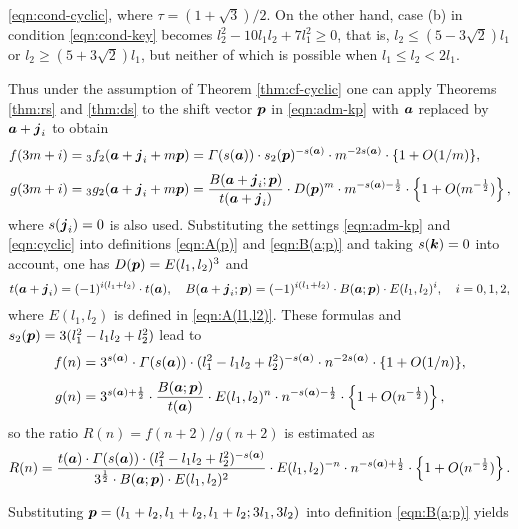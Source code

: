 \documentclass[a4paper,12pt]{article}
\theoremstyle{plain}
\def\vG{\varGamma}
\def\ba{\mbox{\boldmath $a$}}
\def\sba{\mbox{\boldmath ${\scriptstyle a}$}}
\def\bj{\mbox{\boldmath $j$}}
\def\bk{\mbox{\boldmath $k$}}
\def\bp{\mbox{\boldmath $p$}}
\begin{document}
\eqref{eqn:cond-cyclic}, where $\tau = (1+\sqrt{3})/2$.    
On the other hand, case (b) in condition \eqref{eqn:cond-key} becomes   
$l_2^2 - 10 l_1 l_2 + 7 l_1^2 \ge 0$, that is, $l_2 \le (5-3 \sqrt{2}) l_1$ or 
$l_2 \ge (5 + 3\sqrt{2}) l_1$, but neither of which is possible when 
$l_1 \le l_2 < 2 l_1$.  
\par
Thus under the assumption of Theorem \ref{thm:cf-cyclic} one can apply  
Theorems \ref{thm:rs} and \ref{thm:ds} to the shift vector $\bp$ in 
\eqref{eqn:adm-kp} with $\ba$ replaced by $\ba+\bj_i$ to obtain    
\begin{align*}
f(3 m + i) &= {}_3f_2(\ba + \bj_i + m \bp) = \vG(s(\ba)) \cdot s_2(\bp)^{-s(\sba)} 
\cdot m^{-2 s(\sba)} \cdot \{ 1 + O(1/m)\},  \\[1mm]  
g(3 m + i) &=  {}_3g_2(\ba + \bj_i + m \bp) = 
\dfrac{B(\ba + \bj_i ; \bp)}{t(\ba + \bj_i)} \cdot D(\bp)^m 
\cdot m^{-s(\sba)-\frac{1}{2}} 
\cdot  \left\{ 1 + O(m^{-\frac{1}{2} }) \right\},   
\end{align*}
where $s(\bj_i) = 0$ is also used. 
Substituting the settings \eqref{eqn:adm-kp} and \eqref{eqn:cyclic} into 
definitions \eqref{eqn:A(p)} and \eqref{eqn:B(a;p)} and taking $s(\bk) = 0$ 
into account, one has $D(\bp) = E(l_1, l_2)^3$ and  
\[
t(\ba + \bj_i) = (-1)^{i(l_1+l_2)} \cdot t(\ba), \quad 
B(\ba+ \bj_i; \bp) = (-1)^{i (l_1+l_2)} \cdot 
B(\ba; \bp) \cdot E(l_1, l_2)^i, \quad i = 0, 1, 2,   
\]
where $E(l_1, l_2)$ is defined in \eqref{eqn:A(l1,l2)}.  
These formulas and $s_2(\bp) = 3 (l_1^2 -l_1l_2+l_2^2)$ lead to 
\begin{align*}
f(n) 
&=  3^{s(\sba)} \cdot \vG(s(\ba)) \cdot (l_1^2 -l_1 l_2 + l_2^2)^{-s(\sba)}\cdot  
n^{-2 s(\sba)} \cdot \{1 + O(1/n)\},  \\[1mm]  
g(n) &= 3^{s(\sba)+ \frac{1}{2} } \cdot \frac{B(\ba; \bp)}{t(\ba)} 
\cdot E(l_1, l_2)^n \cdot n^{-s(\sba)- \frac{1}{2} } \cdot 
\left\{ 1 + O(n^{-\frac{1}{2}}) \right\},   
\end{align*}
so the ratio $R(n) = f(n+2)/g(n+2)$ is estimated as 
\[
R(n) = \dfrac{ t(\ba) \cdot \vG(s(\ba)) \cdot 
(l_1^2-l_1l_2+l_2^2)^{-s(\sba)} }{ 3^{\frac{1}{2} } \cdot 
B(\ba; \bp) \cdot E(l_1, l_2)^2} \cdot 
E(l_1, l_2)^{-n} \cdot n^{-s(\sba)+ \frac{1}{2} } \cdot 
\left\{1 + O(n^{-\frac{1}{2} }) \right\}.  
\]
\par
Substituting $\bp = (l_1+l_2, l_1+l_2, l_1+l_2; 3l_1, 3l_2)$ into definition 
\eqref{eqn:B(a;p)} yields 
\end{document}
